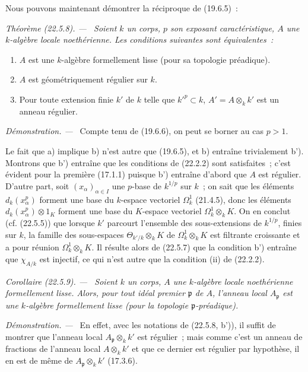 \documentclass[10pt,oneside]{book}
\makeatletter
\newcommand{\setmanualcurrentlabel}[1]{\def\@currentlabel{#1}}
\newenvironment{theorem}[1][]{%
  \setmanualcurrentlabel{#1}\par\medskip\noindent\itshape Théorème (#1). ---\ }{\par}
\newenvironment{corollary}[1][]{%
  \setmanualcurrentlabel{#1}\par\medskip\noindent\itshape Corollaire (#1). ---\ }{\par}
\newenvironment{proof}{%
  \par\medskip\noindent\textit{Démonstration. ---\ }}{\par}
\makeatother
\begin{document}
Nous pouvons maintenant démontrer la réciproque de (19.6.5)~:

\begin{theorem}[22.5.8]
\label{0.22.5.8-fr}
Soient $k$ un corps, $p$ son exposant caractéristique, $A$ une $k$-algèbre
locale noethérienne. Les conditions suivantes sont équivalentes~:
\begin{enumerate}
  \item[a)] $A$ est une $k$-algèbre formellement lisse (pour sa topologie
  préadique).
  \item[b)] $A$ est géométriquement régulier sur $k$.
  \item[b')] Pour toute extension finie $k'$ de $k$ telle que $k'^p\subset k$,
  $A'=A\otimes_kk'$ est un anneau régulier.
\end{enumerate}
\end{theorem}

\begin{proof}
Compte tenu de (19.6.6), on peut se borner au cas $p>1$.

Le fait que a) implique b) n'est autre que (19.6.5), et b) entraîne
trivialement b'). Montrons que b') entraîne que les conditions de (22.2.2) sont
satisfaites~; c'est évident pour la première (17.1.1) puisque b') entraîne
d'abord que $A$ est régulier. D'autre part, soit $(x_\alpha)_{\alpha\in I}$ une
$p$-base de $k^{1/p}$ sur $k$~; on sait que les éléments $d_k(x_\alpha^p)$
forment une base du $k$-espace vectoriel $\Omega^1_k$ (21.4.5), donc les
éléments $d_k(x_\alpha^p)\otimes1_K$ forment une base du $K$-espace vectoriel
$\Omega^1_k\otimes_kK$. On en conclut (cf. (22.5.5)) que lorsque $k'$ parcourt
l'ensemble des sous-extensions de $k^{1/p}$, finies sur $k$, la famille des
sous-espaces $\Theta_{k'/k}\otimes_kK$ de $\Omega^1_k\otimes_kK$ est filtrante
croissante et a pour réunion $\Omega^1_k\otimes_kK$. Il résulte alors de
(22.5.7) que la condition b') entraîne que $\chi_{A/k}$ est injectif, ce qui
n'est autre que la condition (ii) de (22.2.2).
\end{proof}

\begin{corollary}[22.5.9]
\label{0.22.5.9-fr}
Soient $k$ un corps, $A$ une $k$-algèbre locale noethérienne formellement
lisse. Alors, pour tout idéal premier $\mathfrak p$ de $A$, l'anneau local
$A_{\mathfrak p}$ est une $k$-algèbre formellement lisse (pour la topologie
$\mathfrak p$-préadique).
\end{corollary}

\begin{proof}
En effet, avec les notations de (22.5.8, b')), il suffit de montrer que
l'anneau local $A_{\mathfrak p}\otimes_kk'$ est régulier~; mais comme c'est un
anneau de fractions de l'anneau local $A\otimes_kk'$ et que ce dernier est
régulier par hypothèse, il en est de même de $A_{\mathfrak p}\otimes_kk'$
(17.3.6).
\end{proof}
\end{document}

